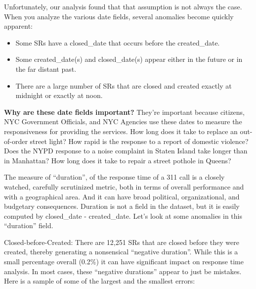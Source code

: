 \documentclass[12pt, titlepage]{article}
\begin{document}
{Unfortunately, our analysis found that that assumption is not always the case. When you analyze the various date fields, several
anomalies become quickly apparent:

	\begin{itemize}
		    \item Some SRs have a closed\_date that occurs before the created\_date.
		    \item Some created\_date(s) and closed\_date(s) appear either in the future or in the far distant past.
		    \item There are a large number of SRs that are closed and created exactly at midnight or exactly at noon. 
	\end{itemize}

\textbf{Why are these date fields important?} They're important because citizens, NYC Government Officials, and NYC Agencies use these dates
to measure the responsiveness for providing the services. How long does it take to replace an out-of-order street light?
How rapid is the response to a report of domestic violence? Does the NYPD response to a noise complaint in Staten Island take
longer than in Manhattan? How long does it take to repair a street pothole in Queens? 

The measure of ``duration'', of the response time of a 311 call is a closely watched, carefully scrutinized metric, 
both in terms of overall performance and with a geographical area. And it can have broad political, organizational,
and budgetary consequences. Duration is not a field in the dataset, but it is easily computed by closed\_date - created\_date.
Let's look at some anomalies in this ``duration'' field.

Closed-before-Created:  There are 12,251 SRs that are closed before they were created, thereby generating a nonsensical 
``negative duration''. While this is a small percentage overall (0.2\%) it can have significant impact on response time analysis.
In most cases, these ``negative durations'' appear to just be mistakes. Here is a sample of some of the largest and the
smallest errors:

}
\end{document}
